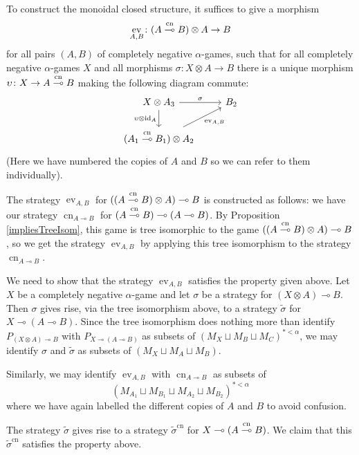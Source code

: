 \documentclass[11pt]{article} %
\theoremstyle{plain} %
\theoremstyle{definition} %
\theoremstyle{note}
\theoremstyle{exercisestyle}
\newcommand*\from{\colon}
\DeclareMathOperator{\id}{id}
\newcommand{\tensor}{\otimes}
\renewcommand{\implies}{\multimap}
\newcommand{\cprd}{\sqcup}
\DeclareMathOperator{\cn}{cn}
\newcommand{\impliescn}{\protect\overset{\cn}{\implies}}
\DeclareMathOperator{\ev}{ev}
\begin{document}
To construct the monoidal closed structure, it suffices to give a morphism
\[
  \ev_{A,B}\from (A\impliescn B)\tensor A\to B
  \]
for all pairs $(A,B)$ of completely negative $\alpha$-games, such that for all completely negative $\alpha$-games $X$ and all morphisms $\sigma\from X\tensor A\to B$ there is a unique morphism $\upsilon\from X\to A\impliescn B$ making the following diagram commute:
\[
  \begin{tikzcd}
    X\tensor A_3 \arrow[r, "\sigma"] \arrow[d, "\upsilon\tensor\id_A"']
      & B_2 \\
    (A_1\impliescn B_1)\tensor A_2 \arrow[ur, "\ev_{A,B}"']
      &
  \end{tikzcd}
  \]
(Here we have numbered the copies of $A$ and $B$ so we can refer to them individually).

The strategy $\ev_{A,B}$ for $((A\impliescn B)\tensor A)\implies B$ is constructed as follows: we have our strategy $\cn_{A\implies B}$ for $(A\impliescn B)\implies(A\implies B)$.  By Proposition \ref{impliesTreeIsom}, this game is tree isomorphic to the game $((A\impliescn B)\tensor A)\implies B$, so we get the strategy $\ev_{A,B}$ by applying this tree isomorphism to the strategy $\cn_{A\implies B}$.  

We need to show that the strategy $\ev_{A,B}$ satisfies the property given above.  Let $X$ be a completely negative $\alpha$-game and let $\sigma$ be a strategy for $(X\tensor A)\implies B$.  Then $\sigma$ gives rise, via the tree isomorphism above, to a strategy $\tilde{\sigma}$ for $X\implies(A\implies B)$.  Since the tree isomorphism does nothing more than identify $P_{(X\tensor A)\implies B}$ with $P_{X\implies(A\implies B)}$ as subsets of $(M_X\cprd M_B\cprd M_C)^{*<\alpha}$, we may identify $\sigma$ and $\tilde{\sigma}$ as subsets of $(M_X\cprd M_A\cprd M_B)$.  

Similarly, we may identify $\ev_{A,B}$ with $\cn_{A\implies B}$ as subsets of 
\[
  \left(M_{A_1}\cprd M_{B_1}\cprd M_{A_2}\cprd M_{B_2}\right)^{*<\alpha}
  \]
where we have again labelled the different copies of $A$ and $B$ to avoid confusion.

The strategy $\tilde{\sigma}$ gives rise to a strategy ${\tilde{\sigma}}^{\cn}$ for $X\implies(A\impliescn B)$.  We claim that this ${\tilde{\sigma}}^{\cn}$ satisfies the property above.  
\end{document}

